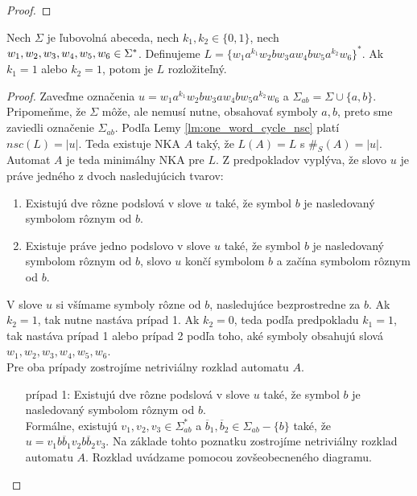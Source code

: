 \begin{proof}
\end{proof}

\begin{proposition}
Nech $ \Sigma $ je ľubovolná abeceda, nech $ k_1,k_2 \in \lbrace 0,1 \rbrace $, nech $ w_1,w_2,w_3,w_4,w_5, \\ w_6 \in \Sigma^* $. Definujeme $ L = \lbrace w_1a^{k_1}w_2bw_3aw_4bw_5a^{k_2}w_6 \rbrace^* $. Ak $ k_1 = 1 $ alebo $ k_2 = 1 $, potom je $ L $ rozložiteľný.
\end{proposition}

\begin{proof}
Zaveďme označenia $ u = w_1a^{k_1}w_2bw_3aw_4bw_5a^{k_2}w_6$ a $ \Sigma_{ab} = \Sigma \cup \lbrace a,b \rbrace $.  Pripomeňme, že $ \Sigma $ môže, ale nemusí nutne, obsahovať symboly $ a,b $, preto sme zaviedli označenie $ \Sigma_{ab} $. Podľa Lemy \ref{lm:one_word_cycle_nsc} platí $ nsc(L) = |u| $. Teda existuje NKA $ A $ taký, že $ L(A) = L $ s $ \#_S(A) = |u| $. Automat $ A $ je teda minimálny NKA pre $ L $. Z predpokladov vyplýva, že slovo $ u $ je práve jedného z dvoch nasledujúcich tvarov:
\begin{enumerate}
	\item Existujú dve rôzne podslová v slove $ u $ také, že symbol $ b $ je nasledovaný symbolom rôznym od $ b $.
	\item Existuje práve jedno podslovo v slove $ u $ také, že symbol $ b $ je nasledovaný symbolom rôznym od $ b $, slovo $ u $ končí symbolom $ b $ a začína symbolom rôznym od $ b $.
\end{enumerate}

V slove $ u $ si všímame symboly rôzne od $ b $, nasledujúce bezprostredne za $ b $. Ak $ k_2 = 1 $, tak nutne nastáva prípad 1. Ak $ k_2 = 0 $, teda podľa predpokladu $ k_1 = 1 $, tak nastáva prípad 1 alebo prípad 2 podľa toho, aké symboly obsahujú slová $ w_1,w_2,w_3,w_4,w_5,w_6 $. \\
Pre oba prípady zostrojíme netriviálny rozklad automatu $ A $.

\begin{enumerate}
\item[prípad 1:] Existujú dve rôzne podslová v slove $ u $ také, že symbol $ b $ je nasledovaný symbolom rôznym od $ b $. 
\\
Formálne, existujú $ v_1,v_2,v_3 \in \Sigma_{ab}^* $ a $ \overline{b}_1,\overline{b}_2 \in \Sigma_{ab} - \lbrace b \rbrace $ také, že $ u = v_1b\overline{b}_1v_2b\overline{b}_2v_3 $. Na základe tohto poznatku zostrojíme netriviálny rozklad automatu $ A $. Rozklad uvádzame pomocou zovšeobecneného diagramu.


\end{enumerate}
\end{proof}
